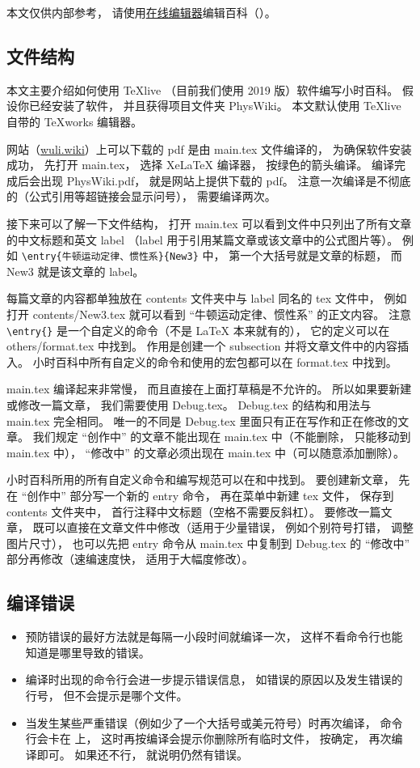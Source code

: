 
本文仅供内部参考， 请使用\href{https://wuli.wiki/editor}{在线编辑器}编辑百科（）。

\subsection{文件结构}

本文主要介绍如何使用 TeXlive （目前我们使用 2019 版）软件编写小时百科。 假设你已经安装了软件， 并且获得项目文件夹 PhysWiki。 本文默认使用 TeXlive 自带的 TeXworks 编辑器。

网站（\href{https://wuli.wiki}{wuli.wiki}）上可以下载的 pdf 是由 main.tex 文件编译的， 为确保软件安装成功， 先打开 main.tex， 选择 XeLaTeX 编译器， 按绿色的箭头编译。 编译完成后会出现 PhysWiki.pdf， 就是网站上提供下载的 pdf。 注意一次编译是不彻底的（公式引用等超链接会显示问号）， 需要编译两次。

接下来可以了解一下文件结构， 打开 main.tex 可以看到文件中只列出了所有文章的中文标题和英文 label （label 用于引用某篇文章或该文章中的公式图片等）。 例如 \verb|\entry{牛顿运动定律、惯性系}{New3}| 中， 第一个大括号就是文章的标题， 而 New3 就是该文章的 label。

每篇文章的内容都单独放在 contents 文件夹中与 label 同名的 tex 文件中， 例如打开 contents/New3.tex 就可以看到 “牛顿运动定律、惯性系” 的正文内容。 注意 \verb|\entry{}| 是一个自定义的命令（不是 LaTeX 本来就有的）， 它的定义可以在 others/format.tex 中找到。 作用是创建一个 subsection 并将文章文件中的内容插入。 小时百科中所有自定义的命令和使用的宏包都可以在 format.tex 中找到。

main.tex 编译起来非常慢， 而且直接在上面打草稿是不允许的。 所以如果要新建或修改一篇文章， 我们需要使用 Debug.tex。 Debug.tex 的结构和用法与 main.tex 完全相同。 唯一的不同是 Debug.tex 里面只有正在写作和正在修改的文章。 我们规定 “创作中” 的文章不能出现在 main.tex 中（不能删除， 只能移动到 main.tex 中）， “修改中” 的文章必须出现在 main.tex 中（可以随意添加删除）。

小时百科所用的所有自定义命令和编写规范可以在和中找到。 要创建新文章， 先在 “创作中” 部分写一个新的 entry 命令， 再在菜单中新建 tex 文件， 保存到 contents 文件夹中， 首行注释中文标题（空格不需要反斜杠）。 要修改一篇文章， 既可以直接在文章文件中修改（适用于少量错误， 例如个别符号打错， 调整图片尺寸）， 也可以先把 entry 命令从 main.tex 中复制到 Debug.tex 的 “修改中” 部分再修改（速编速度快， 适用于大幅度修改）。

\subsection{编译错误}

\begin{itemize}
\item 预防错误的最好方法就是每隔一小段时间就编译一次， 这样不看命令行也能知道是哪里导致的错误。
\item 编译时出现的命令行会进一步提示错误信息， 如错误的原因以及发生错误的行号， 但不会提示是哪个文件。
\item 当发生某些严重错误（例如少了一个大括号或美元符号）时再次编译， 命令行会卡在 \verb|| 上， 这时再按编译会提示你删除所有临时文件， 按确定， 再次编译即可。 如果还不行， 就说明仍然有错误。
\end{itemize}

